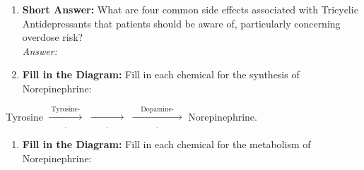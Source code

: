 \begin{enumerate}[label=\textbf{Q4.2.\arabic*}]
    \item \textbf{Short Answer:} What are four common side effects associated with Tricyclic Antidepressants that patients should be aware of, particularly concerning overdose risk? \\
        \textit{Answer:} \\ %



    \item \textbf{Fill in the Diagram:} Fill in each chemical for the synthesis of Norepinephrine: \\
\end{enumerate}
\vspace*{-0.5cm}
    \noindent Tyrosine \(\xrightarrow[\underline{\hspace{2cm}}]{\text{Tyrosine-}}\) \underline{\hspace{2cm}} \(\xrightarrow[\underline{\hspace{2cm}}]{}\) \underline{\hspace{2cm}} \(\xrightarrow[\underline{\hspace{3cm}}]{\text{Dopamine-}}\) Norepinephrine.
\begin{enumerate}[label = \textbf{Q4.2.16}]
    \item \textbf{Fill in the Diagram:} Fill in each chemical for the metabolism of Norepinephrine: \\
\end{enumerate}

